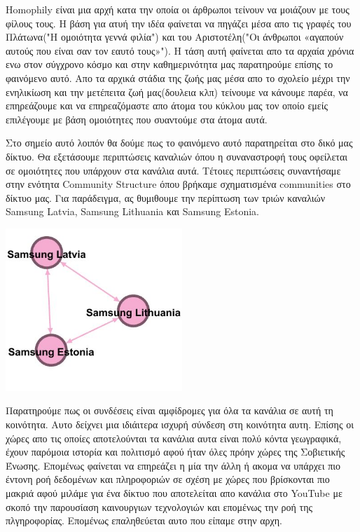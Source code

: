 \documentclass[12pt]{article}
\begin{document}
	Homophily είναι μια αρχή κατα την οποία οι άρθρωποι τείνουν να μοιάζουν με τους φίλους τους. Η βάση για ατυή την ιδέα φαίνεται να πηγάζει μέσα απο τις γραφές του Πλάτωνα("Η ομοιότητα γεννά φιλία") και του Αριστοτέλη("Οι άνθρωποι «αγαπούν αυτούς που είναι σαν τον εαυτό τους»"). Η τάση αυτή φαίνεται απο τα αρχαία χρόνια ενω στον σύγχρονο κόσμο και στην καθημερινότητα μας παρατηρούμε επίσης το φαινόμενο αυτό. Απο τα αρχικά στάδια της ζωής μας μέσα απο το σχολείο μέχρι την ενηλικίωση και την μετέπειτα ζωή μας(δουλεια κλπ) τείνουμε να κάνουμε παρέα, να επηρεάζουμε και να επηρεαζόμαστε απο άτομα του κύκλου μας τον οποίο εμείς επιλέγουμε με βάση ομοιότητες που συαντούμε στα άτομα αυτά.
	\par
	Στο σημείο αυτό λοιπόν θα δούμε πως το φαινόμενο αυτό παρατηρείται στο δικό μας δίκτυο. Θα εξετάσουμε περιπτώσεις καναλιών όπου η συναναστροφή τους οφείλεται σε ομοιότητες που υπάρχουν στα κανάλια αυτά. Τέτοιες περιπτώσεις συναντήσαμε στην ενότητα Community Structure όπου βρήκαμε σχηματισμένα communities στο δίκτυο μας. Για παράδειγμα, ας θυμιθουμε την περίπτωση των τριών καναλιών Samsung Latvia, Samsung Lithuania και Samsung Estonia.
	\begin{center}
		\includegraphics[width=0.5\textwidth]{photos-files/section10/comm.jpg}
	\end{center}
	Παρατηρούμε πως οι συνδέσεις είναι αμφίδρομες για όλα τα κανάλια σε αυτή τη κοινότητα. Αυτο δείχνει μια ιδιάιτερα ισχυρή σύνδεση στη κοινότητα αυτη. Επίσης οι χώρες απο τις οποίες αποτελούνται τα κανάλια αυτα είναι πολύ κόντα γεωγραφικά, έχουν παρόμοια ιστορία και πολιτισμό αφού ήταν όλες πρόην χώρες της Σοβιετικής Ένωσης. Επομένως φαίνεται να επηρεάζει η μία την άλλη ή ακομα να υπάρχει πιο έντονη ροή δεδομένων και πληροφοριών σε σχέση με χώρες που βρίσκονται πιο μακριά αφού μιλάμε για ένα δίκτυο που αποτελείται απο κανάλια στο YouTube με σκοπό την παρουσίαση καινουργιων τεχνολογιών και επομένως την ροή της πλγηροφορίας. Επομένως επαληθεύεται αυτο που είπαμε στην αρχη.
	\vspace{12pt}
	
\end{document}
